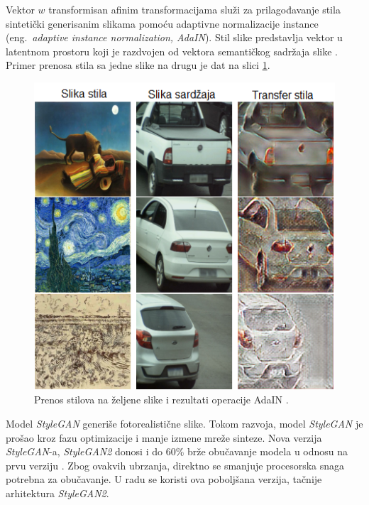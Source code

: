 \documentclass[12pt,oneside]{memoir}
\begin{document}
\clearpage
Vektor \(w\) transformisan afinim transformacijama služi za prilagođavanje stila sintetički generisanim slikama pomoću adaptivne normalizacije instance (eng.~\textit{adaptive instance normalization, AdaIN}). Stil slike predstavlja vektor u latentnom prostoru koji je razdvojen od vektora semantičkog sadržaja slike \cite{huang2017arbitrary}. Primer prenosa stila sa jedne slike na drugu je dat na slici \ref{fig:section2_augmentation_adain}.


\begin{figure}[ht]
    \centering
    \includegraphics[width=1\textwidth]{matfmaster/glava2/adain_cus.png}
    \caption{Prenos stilova na željene slike i rezultati operacije AdaIN \cite{huang2017arbitrary}. }
    \label{fig:section2_augmentation_adain}
\end{figure}


Model \textit{StyleGAN} generiše fotorealistične slike. Tokom razvoja, model \textit{StyleGAN} je prošao kroz fazu optimizacije i manje izmene mreže sinteze. Nova verzija \textit{StyleGAN}-a, \textit{StyleGAN2} donosi i do 60\% brže obučavanje modela u odnosu na prvu verziju \cite{karras2020analyzing}. Zbog ovakvih ubrzanja, direktno se smanjuje procesorska snaga potrebna za obučavanje. U radu se koristi ova poboljšana verzija, tačnije arhitektura \textit{StyleGAN2}.
\end{document}
